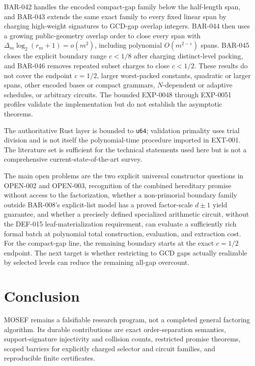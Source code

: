 \documentclass[11pt]{article}
\begin{document}
BAR-042 handles the encoded compact-gap family below the half-length span,
and BAR-043 extends the same exact family to every fixed linear span by
charging high-weight signatures to GCD-gap overlap integers. BAR-044 then
uses a growing public-geometry overlap order to close every span with
\(\Delta_m\log_2(r_m+1)=o(m^2)\), including polynomial
\(O(m^{2-\varepsilon})\) spans. BAR-045 closes the explicit boundary range
\(c<1/8\) after charging distinct-level packing, and BAR-046 removes repeated
subset charges to close \(c<1/2\). These results do not cover
the endpoint \(c=1/2\), larger worst-packed constants, quadratic or larger spans, other
encoded bases or compact grammars, \(N\)-dependent or adaptive schedules, or
arbitrary circuits. The bounded EXP-0048 through EXP-0051 profiles validate the
implementation but do not establish the asymptotic theorems.

The authoritative Rust layer is bounded to \texttt{u64}; validation primality
uses trial division and is not itself the polynomial-time procedure imported
in EXT-001. The literature set is sufficient for the technical statements
used here but is not a comprehensive current-state-of-the-art survey.

The main open problems are the two explicit universal constructor questions
in OPEN-002 and OPEN-003, recognition of the combined hereditary promise
without access to the factorization, whether a non-primorial boundary family
outside BAR-008's explicit-list model has a proved factor-scale
\(d\pm1\) yield guarantee, and whether a precisely defined specialized
arithmetic circuit, without the DEF-015 leaf-materialization requirement, can
evaluate a sufficiently rich formal batch at polynomial total construction,
evaluation, and extraction cost. For the compact-gap line, the remaining
boundary starts at the exact \(c=1/2\) endpoint. The next target is whether
restricting to GCD gaps actually realizable by selected levels can reduce the
remaining all-gap overcount.

\section{Conclusion}

MOSEF remains a falsifiable research program, not a completed general
factoring algorithm. Its durable contributions are exact order-separation
semantics, support-signature injectivity and collision counts, restricted
promise theorems, scoped barriers for explicitly charged selector and circuit
families, and reproducible finite certificates.
\end{document}
